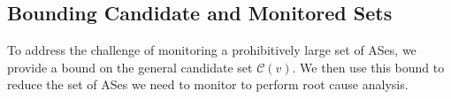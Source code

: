  %

\subsection{Bounding Candidate and Monitored Sets}
\label{subsec:bound}

To address the challenge of monitoring a prohibitively large set of
ASes, we provide a bound on the general candidate set $\mathcal{C}(v)$.
We then use this bound to reduce the set of ASes we need to monitor to
perform root cause analysis.

